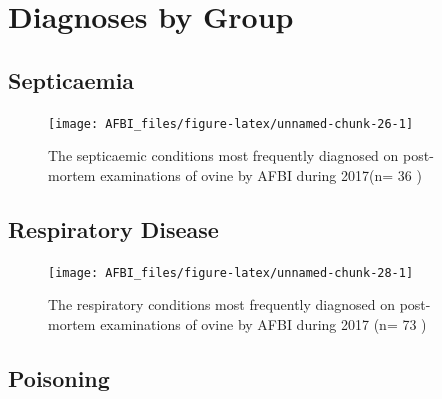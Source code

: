\documentclass[]{book}
\begin{document}
\section{Diagnoses by Group}\label{diagnoses-by-group}

\subsection{Septicaemia}\label{septicaemia}

\begin{figure}

{\centering \texttt{[image: AFBI\_files/figure-latex/unnamed-chunk-26-1]} 

}

\caption{The septicaemic conditions most frequently diagnosed on post-mortem examinations of ovine by AFBI during 2017(n= 36 )}\label{fig:unnamed-chunk-26}
\end{figure}

\subsection{Respiratory Disease}\label{respiratory-disease}

\begin{figure}

{\centering \texttt{[image: AFBI\_files/figure-latex/unnamed-chunk-28-1]} 

}

\caption{The respiratory conditions most frequently diagnosed on post-mortem examinations of ovine by AFBI during 2017 (n= 73 )}\label{fig:unnamed-chunk-28}
\end{figure}

\subsection{Poisoning}\label{poisoning}
\end{document}

